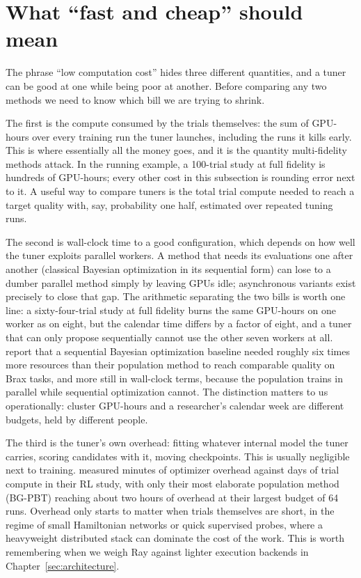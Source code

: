 \section{What ``fast and cheap'' should mean}
\label{sec:costmodel}

The phrase ``low computation cost'' hides three different quantities, and a
tuner can be good at one while being poor at another. Before comparing any
two methods we need to know which bill we are trying to shrink.

The first is the compute consumed by the trials themselves: the sum of
GPU-hours over every training run the tuner launches, including the runs it
kills early. This is where essentially all the money goes, and it is the
quantity multi-fidelity methods attack. In the running example, a 100-trial
study at full fidelity is hundreds of GPU-hours; every other cost in this
subsection is rounding error next to it. A useful way to compare tuners is
the total trial compute needed to reach a target quality with, say,
probability one half, estimated over repeated tuning runs.

The second is wall-clock time to a good configuration, which depends on how
well the tuner exploits parallel workers. A method that needs its evaluations
one after another (classical Bayesian optimization in its sequential form)
can lose to a dumber parallel method simply by leaving GPUs idle;
asynchronous variants exist precisely to close that gap. The
arithmetic separating the two bills is worth one line: a
sixty-four-trial study at full fidelity burns the same GPU-hours on
one worker as on eight, but the calendar time differs by a factor of
eight, and a tuner that can only propose sequentially cannot use the
other seven workers at all.
\citet{wan2022bgpbt} report that a sequential Bayesian optimization baseline
needed roughly six times more resources than their population method to reach
comparable quality on Brax tasks, and more still in wall-clock terms, because
the population trains in parallel while sequential optimization cannot. The
distinction matters to us operationally: cluster GPU-hours and a researcher's
calendar week are different budgets, held by different people.

The third is the tuner's own overhead: fitting whatever internal model
the tuner carries, scoring candidates with it, moving checkpoints. This
is usually negligible next to
training. \citet{eimer2023hyperparameters} measured minutes of optimizer
overhead against days of trial compute in their RL study, with only their
most elaborate population method (BG-PBT) reaching about two hours of overhead at
their largest budget of 64 runs. Overhead only starts to matter when trials
themselves are short, in the regime of small Hamiltonian networks or quick
supervised probes, where a heavyweight distributed stack can dominate the
cost of the work. This is worth remembering when we weigh Ray against
lighter execution backends in Chapter~\ref{sec:architecture}.


